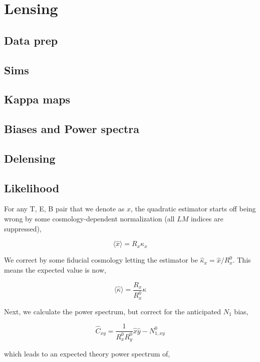 \documentclass[a4paper, 11pt]{article}
\def\ba{\begin{eqnarray}}
\def\ea{\end{eqnarray}}
\begin{document}
 
\section{Lensing}

\subsection{Data prep}
\subsection{Sims}
\subsection{Kappa maps}
\subsection{Biases and Power spectra}
\subsection{Delensing}
\subsection{Likelihood}

For any T, E, B pair that we denote as $x$, the quadratic estimator starts off being wrong by some cosmology-dependent normalization (all $LM$ indices are suppressed),

$$
\langle \hat{x} \rangle = R_{x} \kappa_x 
$$

We correct by some fiducial cosmology letting the estimator be $\hat{\kappa}_x = \hat{x} / R^0_x$. This means the expected value is now,

$$
\langle\hat\kappa\rangle = \frac{R_x}{R^0_x}\kappa 
$$

Next, we calculate the power spectrum, but correct for the anticipated $N_1$ bias,

$$
\hat{C}_{xy}=\frac{1}{R^0_xR^0_y}\hat{x}\hat{y} - N_{1,xy}^0
$$

which leads to an expected theory power spectrum of,
\end{document}
